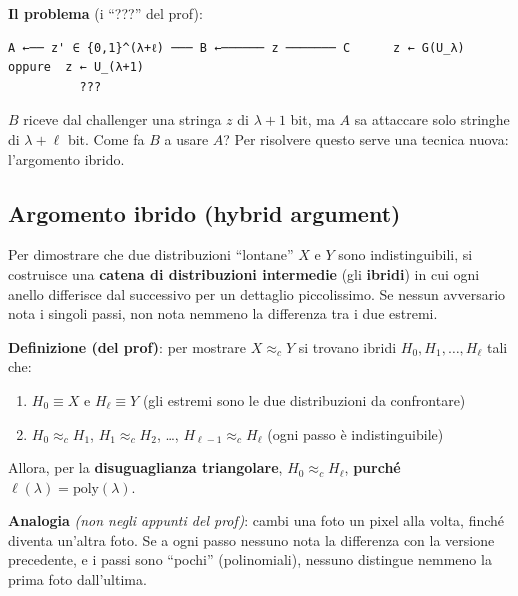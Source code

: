 \textbf{Il problema} (i ``???'' del prof):

\begin{verbatim}
A ←── z' ∈ {0,1}^(λ+ℓ) ─── B ←────── z ─────── C      z ← G(U_λ)  oppure  z ← U_(λ+1)
          ???
\end{verbatim}

\(B\) riceve dal challenger una stringa \(z\) di \(\lambda + 1\) bit, ma \(A\) sa attaccare solo stringhe di \(\lambda + \ell\) bit. Come fa \(B\) a usare \(A\)? Per risolvere questo serve una tecnica nuova: l'argomento ibrido.

\subsection{Argomento ibrido (hybrid argument)}

\begin{inbreve}

Per dimostrare che due distribuzioni ``lontane'' \(X\) e \(Y\) sono indistinguibili, si costruisce una \textbf{catena di distribuzioni intermedie} (gli \textbf{ibridi}) in cui ogni anello differisce dal successivo per un dettaglio piccolissimo. Se nessun avversario nota i singoli passi, non nota nemmeno la differenza tra i due estremi.

\end{inbreve}

\textbf{Definizione (del prof)}: per mostrare \(X \approx_c Y\) si trovano ibridi \(H_0, H_1, \dots, H_\ell\) tali che:

\begin{enumerate}
\def\labelenumi{\arabic{enumi}.}
\tightlist
\item
  \(H_0 \equiv X\) e \(H_\ell \equiv Y\) (gli estremi sono le due distribuzioni da confrontare)
\item
  \(H_0 \approx_c H_1\), \(H_1 \approx_c H_2\), \ldots, \(H_{\ell-1} \approx_c H_\ell\) (ogni passo è indistinguibile)
\end{enumerate}

Allora, per la \textbf{disuguaglianza triangolare}, \(H_0 \approx_c H_\ell\), \textbf{purché} \(\ell(\lambda) = \text{poly}(\lambda)\).

\begin{nota}

\textbf{Analogia} \emph{(non negli appunti del prof)}: cambi una foto un pixel alla volta, finché diventa un'altra foto. Se a ogni passo nessuno nota la differenza con la versione precedente, e i passi sono ``pochi'' (polinomiali), nessuno distingue nemmeno la prima foto dall'ultima.

\end{nota}

